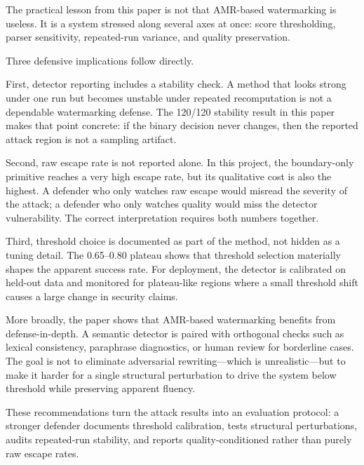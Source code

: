 The practical lesson from this paper is not that AMR-based watermarking is useless. It is a system stressed along several axes at once: score thresholding, parser sensitivity, repeated-run variance, and quality preservation.

Three defensive implications follow directly.

First, detector reporting includes a stability check. A method that looks strong under one run but becomes unstable under repeated recomputation is not a dependable watermarking defense. The 120/120 stability result in this paper makes that point concrete: if the binary decision never changes, then the reported attack region is not a sampling artifact.

Second, raw escape rate is not reported alone. In this project, the boundary-only primitive reaches a very high escape rate, but its qualitative cost is also the highest. A defender who only watches raw escape would misread the severity of the attack; a defender who only watches quality would miss the detector vulnerability. The correct interpretation requires both numbers together.

Third, threshold choice is documented as part of the method, not hidden as a tuning detail. The 0.65--0.80 plateau shows that threshold selection materially shapes the apparent success rate. For deployment, the detector is calibrated on held-out data and monitored for plateau-like regions where a small threshold shift causes a large change in security claims.

More broadly, the paper shows that AMR-based watermarking benefits from defense-in-depth. A semantic detector is paired with orthogonal checks such as lexical consistency, paraphrase diagnostics, or human review for borderline cases. The goal is not to eliminate adversarial rewriting---which is unrealistic---but to make it harder for a single structural perturbation to drive the system below threshold while preserving apparent fluency.

These recommendations turn the attack results into an evaluation protocol: a stronger defender documents threshold calibration, tests structural perturbations, audits repeated-run stability, and reports quality-conditioned rather than purely raw escape rates.
